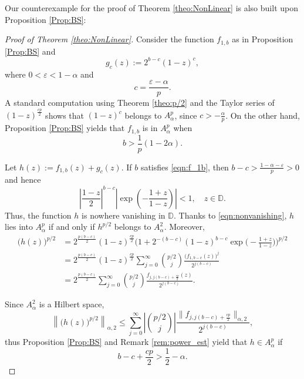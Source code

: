 \documentclass[12pt]{amsart}
\theoremstyle{definition}
\newcommand{\D}{\mathbb{{D}}}
\numberwithin{equation}{section}
\begin{document}
        Our counterexample for the proof of Theorem \ref{theo:NonLinear} is also built upon Proposition \ref{Prop:BS}:

        \begin{proof}[Proof of Theorem \ref{theo:NonLinear}]
        	Consider the function $f_{1, b}$ as in Proposition \ref{Prop:BS} and 
                \[
                    g_c(z):=2^{b-c}(1-z)^c,
                \]
                where $0<\varepsilon<1-\alpha$ and
                \[
                    c=\frac{\varepsilon-\alpha}{p}.
                \]
                A standard computation using Theorem \ref{theo:p/2} and the Taylor series of $(1-z)^\frac{cp}{2}$ shows that $(1-z)^c$ belongs to $A^p_\alpha$, since $c>-\frac{\alpha}{p}$. On the other hand, Proposition \ref{Prop:BS} yields that $f_{1, b}$ is in $A^p_\alpha$ when 
                \begin{equation}
                \label{eqn:f_1b}
                    b>\frac{1}{p}(1-2\alpha).
                \end{equation}
            
            Let $h(z) := f_{1, b}(z) + g_c(z)$. If $b$ satisfies \eqref{eqn:f_1b}, then $b - c > \frac{1 - \alpha - \varepsilon}{p} > 0$ and hence 
                \[
                    \left| \dfrac{1-z}{2} \right|^{b-c} \left|\exp\left(-\frac{1+z}{1-z}\right)\right| < 1, \quad z \in \mathbb{D}.
                \]
                Thus, the function $h$ is nowhere vanishing in $\D$. Thanks to \eqref{eqn:nonvanishing}, $h$ lies into $A_\alpha^p$ if and only if $h^{p/2}$ belongs to $A^2_\alpha$. Moreover,
            	\[
            		\begin{aligned}
            		\big(h(z)\big)^{p/2} & = 2^{\frac{p(b-c)}{2}} (1-z)^{\frac{cp}{2}}\Bigg(1+ 2^{-(b-c)}(1-z)^{b-c}\exp\bigg(-\frac{1+z}{1-z}\bigg)\Bigg)^{p/2} \\
            		& = 2^{\frac{p(b-c)}{2}} (1-z)^{\frac{cp}{2}} \sum_{j = 0}^\infty \binom{p/2}{j} \frac{\big(f_{1,b-c}(z)\big)^j}{2^{j(b-c)}} \\
            		& = 2^{\frac{p(b-c)}{2}}  \sum_{j = 0}^\infty \binom{p/2}{j} \frac{f_{j,j(b-c) + \frac{cp}{2}}(z)}{2^{j(b-c)}}.
            		\end{aligned}
            	\]
            
            Since $ A^2_\alpha$ is a Hilbert space,
                \[
                    \left\|\big(h(z)\big)^{p/2}\right\|_{\alpha, 2}\le\sum_{j = 0}^\infty \left|\binom{p/2}{j}\right| \frac{\|f_{j,j(b-c) + \frac{cp}{2}}\|_{\alpha, 2}}{2^{j(b-c)}},
                \]
                thus Proposition \ref{Prop:BS} and Remark \ref{rem:power_est} yield that $h \in A^p_\alpha$ if 
                    \begin{equation}
                    \label{eqn:h}
                        b-c+\frac{cp}{2}>\frac{1}{2}-\alpha.
                    \end{equation}
            

\end{proof}
\end{document}
